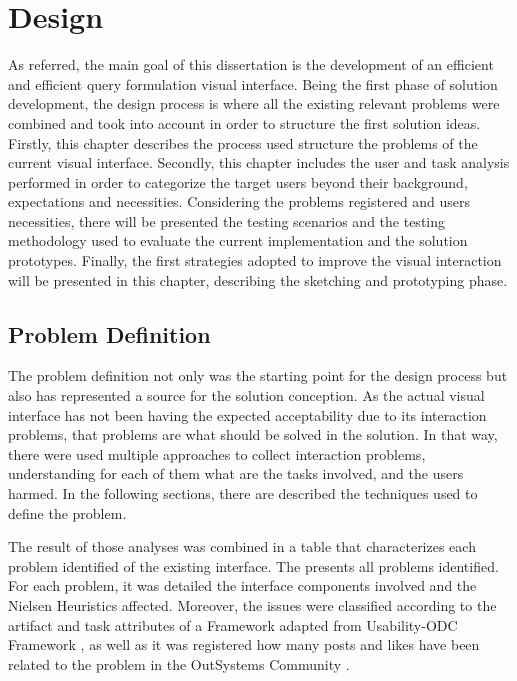 \chapter{Design}
\label{cha:design}

As referred, the main goal of this dissertation is the development of an efficient and efficient query formulation visual interface. Being the first phase of solution development, the design process is where all the existing relevant problems were combined and took into account in order to structure the first solution ideas. Firstly, this chapter describes the process used structure the problems of the current visual interface. Secondly, this chapter includes the user and task analysis performed in order to categorize the target users beyond their background, expectations and necessities. Considering the problems registered and users necessities, there will be presented the testing scenarios and the testing methodology used to evaluate the current implementation and the solution prototypes. Finally, the first strategies adopted to improve the visual interaction will be presented in this chapter, describing the sketching and prototyping phase.

\section{Problem Definition}
\label{sec:problem_definition}

The problem definition not only was the starting point for the design process but also has represented a source for the solution conception. As the actual visual interface has not been having the expected acceptability due to its interaction problems, that problems are what should be solved in the solution. In that way, there were used multiple approaches to collect interaction problems, understanding for each of them what are the tasks involved, and the users harmed. In the following sections, there are described the techniques used to define the problem. 

The result of those analyses was combined in a table that characterizes each problem identified of the existing interface. The  presents all problems identified. For each problem, it was detailed the interface components involved and the Nielsen Heuristics \cite{nielsen_heuristics} affected. Moreover, the issues were classified according to the artifact and task attributes of a Framework adapted from Usability-ODC Framework \cite{in_process_usability_problem_classification_analysis_improvement}, as well as it was registered how many posts and likes have been related to the problem in the OutSystems Community \cite{outsystems_community}.

